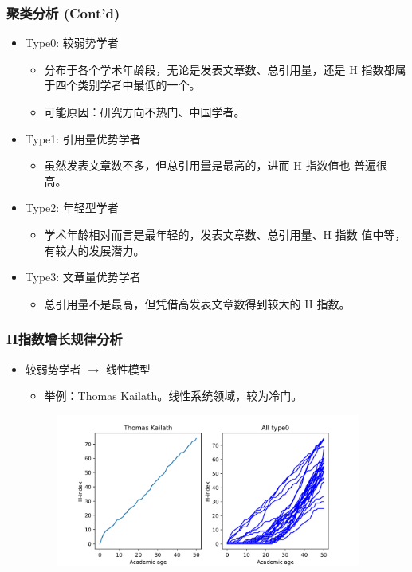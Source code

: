 \documentclass[11pt,compress,t, xcolor=table]{beamer}
\begin{document}
\begin{frame}
	\frametitle{聚类分析 (Cont'd)}
	
\begin{itemize}
	\item Type0: \textcolor{TsinghuaPurple}{较弱势学者}
	\begin{itemize}
		\item 分布于各个学术年龄段，无论是发表文章数、总引用量，还是 H 指数都属于四个类别学者中最低的一个。
		\item 可能原因：研究方向不热门、中国学者。
	\end{itemize}

	\item Type1: \textcolor{TsinghuaPurple}{引用量优势学者}
	\begin{itemize}
		\item 虽然发表文章数不多，但总引用量是最高的，进而 H 指数值也
		普遍很高。
	\end{itemize}
	
	\item Type2: \textcolor{TsinghuaPurple}{年轻型学者}
	\begin{itemize}
		\item 学术年龄相对而言是最年轻的，发表文章数、总引用量、H 指数
		值中等，有较大的发展潜力。
	\end{itemize}
	
	\item Type3: \textcolor{TsinghuaPurple}{文章量优势学者}
	\begin{itemize}
		\item 总引用量不是最高，但凭借高发表文章数得到较大的 H 指数。
	\end{itemize}
\end{itemize}
\end{frame}

\begin{frame}
	\frametitle{H指数增长规律分析}
	
\begin{itemize}
	\item 较弱势学者 $\rightarrow$ \textcolor{TsinghuaPurple}{线性模型}
	\begin{itemize}
		\item 举例：Thomas Kailath。线性系统领域，较为冷门。
	\end{itemize}
	
	\begin{figure}[H]
		\small
		\centering
		\includegraphics[width=10cm]{image/Thomas Kailath.png}
	\end{figure}
\end{itemize}
\end{frame}
\end{document}
